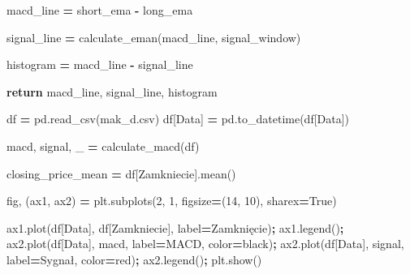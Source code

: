 \documentclass[
]{article}
\newenvironment{Shaded}{\begin{snugshade}}{\end{snugshade}}
\newcommand{\ControlFlowTok}[1]{\textcolor[rgb]{0.13,0.29,0.53}{\textbf{#1}}}
\newcommand{\DecValTok}[1]{\textcolor[rgb]{0.00,0.00,0.81}{#1}}
\newcommand{\NormalTok}[1]{#1}
\newcommand{\OperatorTok}[1]{\textcolor[rgb]{0.81,0.36,0.00}{\textbf{#1}}}
\newcommand{\StringTok}[1]{\textcolor[rgb]{0.31,0.60,0.02}{#1}}
\newcommand{\VariableTok}[1]{\textcolor[rgb]{0.00,0.00,0.00}{#1}}
\begin{document}
\begin{Shaded}
\begin{Highlighting}[]
\NormalTok{    macd\_line }\OperatorTok{=}\NormalTok{ short\_ema }\OperatorTok{{-}}\NormalTok{ long\_ema}

\NormalTok{    signal\_line }\OperatorTok{=}\NormalTok{ calculate\_eman(macd\_line, signal\_window)}

\NormalTok{    histogram }\OperatorTok{=}\NormalTok{ macd\_line }\OperatorTok{{-}}\NormalTok{ signal\_line}

    \ControlFlowTok{return}\NormalTok{ macd\_line, signal\_line, histogram}

\NormalTok{df }\OperatorTok{=}\NormalTok{ pd.read\_csv(}\StringTok{\textquotesingle{}mak\_d.csv\textquotesingle{}}\NormalTok{)}
\NormalTok{df[}\StringTok{\textquotesingle{}Data\textquotesingle{}}\NormalTok{] }\OperatorTok{=}\NormalTok{ pd.to\_datetime(df[}\StringTok{\textquotesingle{}Data\textquotesingle{}}\NormalTok{])}

\NormalTok{macd, signal, \_ }\OperatorTok{=}\NormalTok{ calculate\_macd(df)}

\NormalTok{closing\_price\_mean }\OperatorTok{=}\NormalTok{ df[}\StringTok{\textquotesingle{}Zamkniecie\textquotesingle{}}\NormalTok{].mean()}

\NormalTok{fig, (ax1, ax2) }\OperatorTok{=}\NormalTok{ plt.subplots(}\DecValTok{2}\NormalTok{, }\DecValTok{1}\NormalTok{, figsize}\OperatorTok{=}\NormalTok{(}\DecValTok{14}\NormalTok{, }\DecValTok{10}\NormalTok{), sharex}\OperatorTok{=}\VariableTok{True}\NormalTok{)}

\NormalTok{ax1.plot(df[}\StringTok{\textquotesingle{}Data\textquotesingle{}}\NormalTok{], df[}\StringTok{\textquotesingle{}Zamkniecie\textquotesingle{}}\NormalTok{], label}\OperatorTok{=}\StringTok{\textquotesingle{}Zamknięcie\textquotesingle{}}\NormalTok{)}\OperatorTok{;}
\NormalTok{ax1.legend()}\OperatorTok{;}
\NormalTok{ax2.plot(df[}\StringTok{\textquotesingle{}Data\textquotesingle{}}\NormalTok{], macd, label}\OperatorTok{=}\StringTok{\textquotesingle{}MACD\textquotesingle{}}\NormalTok{, color}\OperatorTok{=}\StringTok{\textquotesingle{}black\textquotesingle{}}\NormalTok{)}\OperatorTok{;}
\NormalTok{ax2.plot(df[}\StringTok{\textquotesingle{}Data\textquotesingle{}}\NormalTok{], signal, label}\OperatorTok{=}\StringTok{\textquotesingle{}Sygnał\textquotesingle{}}\NormalTok{, color}\OperatorTok{=}\StringTok{\textquotesingle{}red\textquotesingle{}}\NormalTok{)}\OperatorTok{;}
\NormalTok{ax2.legend()}\OperatorTok{;}
\NormalTok{plt.show()}
\end{Highlighting}
\end{Shaded}
\end{document}
